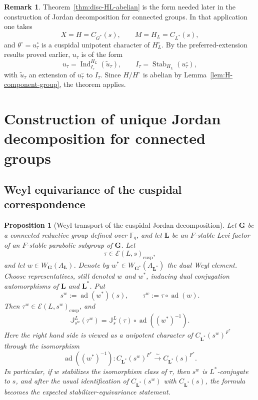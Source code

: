 \documentclass{amsart}
\theoremstyle{plain}
\numberwithin{equation}{section}
\newtheorem{proposition}[theorem]{Proposition}
\theoremstyle{definition}
\newtheorem{remark}[theorem]{Remark}
\newcommand{\cE}{\mathcal{E}}
\newcommand{\Ind}{\operatorname{Ind}}
\newcommand{\fq}{\mathbb{F}_{q}}
\newcommand{\J}{\mathbb{J}}
\newcommand{\Stab}{\operatorname{Stab}}
\newcommand{\ad}{\operatorname{ad}}
\newcommand{\cusp}{\operatorname{cusp}}
\newcommand{\bG}{\mathbf{G}}
\newcommand{\bL}{\mathbf{L}}
\begin{document}
\begin{remark}\label{rmk:disc-HL-abelian-application}
Theorem~\ref{thm:disc-HL-abelian} is the form needed later in the construction of
Jordan decomposition for connected groups. In that application one takes
\[
X=H=C_{G^*}(s),\qquad M=H_L=C_{L^*}(s),
\]
and \(\theta^\circ=u_\tau^\circ\) is a cuspidal unipotent character of \(H_L^\circ\).
By the preferred-extension results proved earlier, \(u_\tau\) is of the form
\[
u_\tau = \Ind_{I_\tau}^{H_L}(\widetilde u_\tau),
\qquad
I_\tau=\Stab_{H_L}(u_\tau^\circ),
\]
with \(\widetilde u_\tau\) an extension of \(u_\tau^\circ\) to \(I_\tau\). Since
\(H/H^\circ\) is abelian by Lemma~\ref{lem:H-component-group}, the theorem applies.
\end{remark}
\medskip
\section{Construction of unique Jordan decomposition for connected groups}
\label{sec:construction-unique-JD-connected-groups}\medskip
\subsection{Weyl equivariance of the cuspidal correspondence}
\begin{proposition}[Weyl transport of the cuspidal Jordan decomposition]
\label{prop:weyl-equivariance}
Let $\bG$ be a connected reductive group defined over $\fq$, and let $\bL$ be an
$F$-stable Levi factor of an $F$-stable parabolic subgroup of $\bG$.  Let
\[
        \tau\in \cE(L,s)_{\cusp},
\]
and let \(w\in W_{\bG}(A_{\bL})\).  Denote by \(w^*\in
W_{\bG^*}(A_{\bL^*})\) the dual Weyl element.  Choose representatives, still
denoted \(w\) and \(w^*\), inducing dual conjugation automorphisms of \(\bL\)
and \(\bL^*\).  Put
\[
        s^w:=\ad(w^*)(s),
        \qquad
        \tau^w:=\tau\circ\ad(w).
\]
Then \(\tau^w\in \cE(L,s^w)_{\cusp}\), and
\begin{equation}\label{eq:weyl-transport-cuspidal-JD}
        \J_{s^w}^{L}(\tau^w)
        =
        \J_s^{L}(\tau)\circ\ad((w^*)^{-1}).
\end{equation}
Here the right hand side is viewed as a unipotent character of
\(C_{\bL^*}(s^w)^{F^*}\) through the isomorphism
\[
        \ad((w^*)^{-1}):C_{\bL^*}(s^w)^{F^*}
        \xrightarrow{\sim}
        C_{\bL^*}(s)^{F^*}.
\]
In particular, if \(w\) stabilizes the isomorphism class of \(\tau\), then
\(s^w\) is \(L^*\)-conjugate to \(s\), and after the usual identification of
\(C_{\bL^*}(s^w)\) with \(C_{\bL^*}(s)\), the formula becomes the expected
stabilizer-equivariance statement.
\end{proposition}
\end{document}
